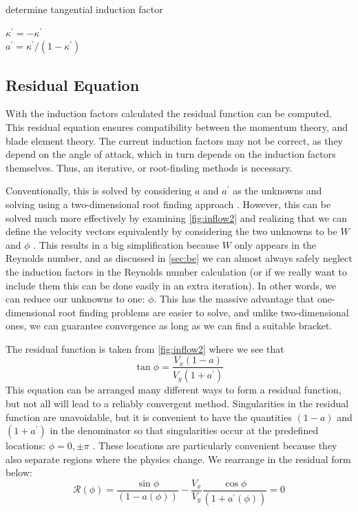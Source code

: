 \documentclass{article}
\begin{document}
\begin{algorithm}[htbp]
\caption{determine tangential induction factor}
\begin{algorithmic}

    \State $\kappa^\prime = -\kappa^\prime$
\EndIf
\\
\State $a^\prime = \kappa^\prime/(1 - \kappa^\prime)$
\end{algorithmic}
\label{alg:ap}
\end{algorithm}



\subsection{Residual Equation}

With the induction factors calculated the residual function can be computed. This residual equation ensures compatibility between the momentum theory, and blade element theory. The current induction factors may not be correct, as they depend on the angle of attack, which in turn depends on the induction factors themselves.  Thus, an iterative, or root-finding methods is necessary.

Conventionally, this is solved by considering $a$ and $a^\prime$ as the unknowns and solving using a two-dimensional root finding approach \cite{Manwell2009-Wind-Energy,Hansen2008-Aerodynamics-Wind,Burton2011-Wind-Energy}.  However, this can be solved much more effectively by examining \cref{fig:inflow2} and realizing that we can define the velocity vectors equivalently by considering the two unknowns to be $W$ and $\phi$ \cite{Ning2014-Simple-Solution}.  This results in a big simplification because $W$ only appears in the Reynolds number, and as discussed in \cref{sec:be} we can almost always safely neglect the induction factors in the Reynolds number calculation (or if we really want to include them this can be done easily in an extra iteration). In other words, we can reduce our unknowns to one: $\phi$.  This has the massive advantage that one-dimensional root finding problems are easier to solve, and unlike two-dimensional ones, we can guarantee convergence as long as we can find a suitable bracket.

The residual function is taken from \cref{fig:inflow2} where we see that
\[\tan\phi = \frac{V_x (1 - a)}{V_y (1 + a^\prime)}\]
This equation can be arranged many different ways to form a residual function, but not all will lead to a reliably convergent method. Singularities in the residual function are unavoidable, but it is convenient to have the quantities $(1 - a)$ and $(1 + a^\prime)$ in the denominator so that singularities occur at the predefined locations: $\phi = 0, \pm\pi$ \cite{Ning2014-Simple-Solution}. These locations are particularly convenient because they also separate regions where the physics change.  We rearrange in the residual form below:
\begin{equation}
    \mathcal{R}(\phi) = \frac{\sin\phi}{(1 - a(\phi))} - \frac{V_x}{V_y} \frac{\cos\phi}{(1 + a^\prime(\phi))} = 0
    \label{eq:residual}
\end{equation}
\end{document}
